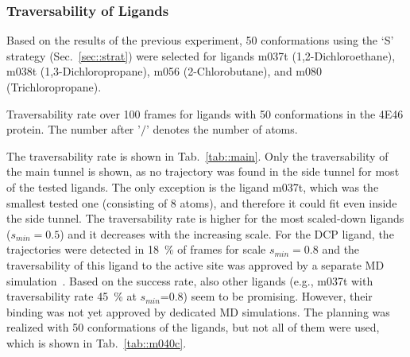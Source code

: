 \documentclass[usletter, 10pt, conference]{ieeeconf} %
\def\smin{s_{min}}
\begin{document}
\subsubsection{Traversability of Ligands}

Based on the results of the previous experiment, 50 conformations using the `S' strategy (Sec.~\ref{sec::strat})  were selected for ligands 
m037t (1,2-Dichloroethane), m038t (1,3-Dichloropropane), m056 (2-Chlorobutane), and m080 (Trichloropropane).


\begin{table}[bt]
\centering
\caption{\label{tab::main}
    \small
    Traversability rate over 100 frames for ligands with 50 conformations in the 4E46 protein.
    The number after '$/$' denotes the number of atoms.
}
\small
\renewcommand{\tabcolsep}{2pt}
{
\scriptsize
%
}
\end{table}


The traversability rate is shown in Tab.~\ref{tab::main}. 
Only the traversability of the main tunnel is shown, as no trajectory was found in the side tunnel for most of the tested ligands.
The only exception is the ligand m037t, which was the smallest tested one (consisting of 8 atoms), and therefore it could fit even inside the side tunnel.
The traversability rate is higher for the most scaled-down ligands ($\smin=0.5$) and it decreases with the increasing scale.
For the DCP ligand, the trajectories were detected in 18~\% of frames for scale $\smin=0.8$ and the traversability of this ligand
to the active site was approved by a separate MD simulation~\cite{marques2017catalytic}.
Based on the success rate, also other ligands (e.g., m037t with traversability rate 45~\% at $\smin$=0.8) seem to be promising.
However, their binding was not yet approved by dedicated MD simulations.
The planning was realized with 50 conformations of the ligands, but not all of them were used, which is shown in Tab.~\ref{tab::m040c}.
\end{document}
